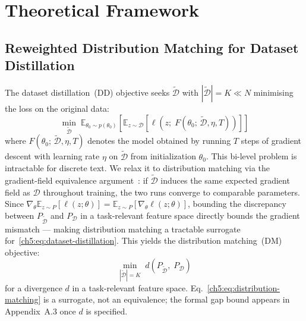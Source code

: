 \section{Theoretical Framework} \label{sec:53-research03-theory}

\subsection{Reweighted Distribution Matching for Dataset Distillation} \label{ch5:sec:03-theory-rdm}

\begin{foldable} %
    The dataset distillation~(DD) objective seeks $\tilde{\mathcal{D}}$ with $|\tilde{\mathcal{D}}| = K \ll N$ minimising the loss on the original data:
    \begin{equation}
        \min_{\tilde{\mathcal{D}}}\; \mathbb{E}_{\theta_0 \sim p(\theta_0)} \left[ \mathbb{E}_{z \sim \mathcal{D}} \left[ \ell\!\left(z;\; F(\theta_0;\, \tilde{\mathcal{D}}, \eta, T)\right) \right] \right]
        \label{ch5:eq:dataset-distillation}
    \end{equation}
    where $F(\theta_0;\, \tilde{\mathcal{D}}, \eta, T)$ denotes the model obtained by running $T$ steps of gradient descent with learning rate $\eta$ on $\tilde{\mathcal{D}}$ from initialization $\theta_0$.
    This bi-level problem is intractable for discrete text.
    We relax it to distribution matching via the gradient-field equivalence argument~\cite{zhao2023dataset}: if $\tilde{\mathcal{D}}$ induces the same expected gradient field as $\mathcal{D}$ throughout training, the two runs converge to comparable parameters.
    Since $\nabla_\theta \mathbb{E}_{z \sim P}[\ell(z;\theta)] = \mathbb{E}_{z \sim P}[\nabla_\theta \ell(z;\theta)]$, bounding the discrepancy between $P_{\tilde{\mathcal{D}}}$ and $P_{\mathcal{D}}$ in a task-relevant feature space directly bounds the gradient mismatch --- making distribution matching a tractable surrogate for~\eqref{ch5:eq:dataset-distillation}.
    This yields the distribution matching~(DM) objective:
    \begin{equation}
        \min_{|\tilde{\mathcal{D}}| = K}\; d\!\left(P_{\tilde{\mathcal{D}}},\; P_{\mathcal{D}}\right)
        \label{ch5:eq:distribution-matching}
    \end{equation}
    for a divergence $d$ in a task-relevant feature space.
    Eq.~\eqref{ch5:eq:distribution-matching} is a surrogate, not an equivalence; the formal gap bound appears in Appendix~A.3 once $d$ is specified.
\end{foldable}

